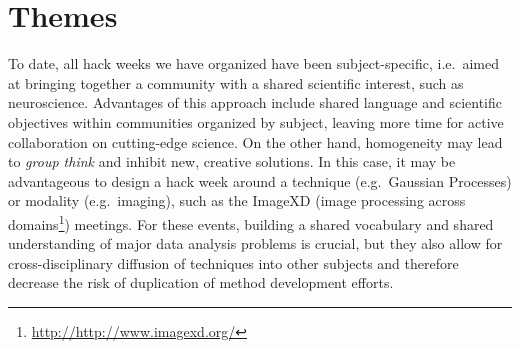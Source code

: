 \section*{Themes}

To date, all hack weeks we have organized have been subject-specific, i.e.\ aimed at bringing together a community with a shared scientific interest, such as neuroscience.
Advantages of this approach include shared language and scientific objectives within communities organized by subject, leaving more time for active collaboration on cutting-edge science.
On the other hand, homogeneity may lead to \textit{group think} and inhibit new, creative solutions.
In this case, it may be advantageous to design a hack week around a technique (e.g.\ Gaussian Processes) or modality (e.g.\ imaging), such as the ImageXD (image processing across domains\footnote{\url{http://http://www.imagexd.org/}}) meetings.
For these events, building a shared vocabulary and shared understanding of major data analysis problems is crucial, but they also allow for cross-disciplinary diffusion of techniques into other subjects and therefore decrease the risk of duplication of method development efforts.